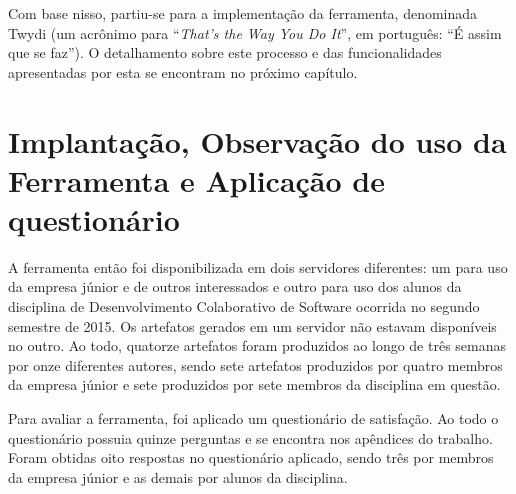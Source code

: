 Com base nisso, partiu-se para a implementação da ferramenta, denominada Twydi (um acrônimo para ``\textit{That's the Way You Do It}'', em português: ``É assim que se faz''). O detalhamento sobre este processo e das funcionalidades apresentadas por esta se encontram no próximo capítulo.

\section{Implantação, Observação do uso da Ferramenta e Aplicação de questionário}

A ferramenta então foi disponibilizada em dois servidores diferentes: um para uso da empresa júnior e de outros interessados e outro para uso dos alunos da disciplina de Desenvolvimento Colaborativo de Software ocorrida no segundo semestre de 2015. Os artefatos gerados em um servidor não estavam disponíveis no outro. Ao todo, quatorze artefatos foram produzidos ao longo de três semanas por onze diferentes autores, sendo sete artefatos produzidos por quatro membros da empresa júnior e sete produzidos por sete membros da disciplina em questão.

Para avaliar a ferramenta, foi aplicado um questionário de satisfação. Ao todo o questionário possuia quinze perguntas e se encontra nos apêndices do trabalho. Foram obtidas oito respostas no questionário aplicado, sendo três por membros da empresa júnior e as demais por alunos da disciplina.
